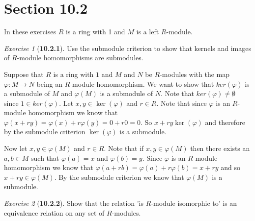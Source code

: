 \documentclass[12pt]{amsart}
\makeatletter
\theoremstyle{remark}
\newtheorem*{exercise}{Exercise}%
\renewenvironment{proof}[1][\proofname]{\par\doublespacing
  \pushQED{\qed}%
  \normalfont \topsep6\p@\@plus6\p@\relax
  \list{}{%
    \settowidth{\leftmargin}{\itshape\proofname:\hskip\labelsep}%
    \setlength{\labelwidth}{0pt}%
    \setlength{\itemindent}{-\leftmargin}%
  }%
  \item[\hskip\labelsep\itshape#1\@addpunct{:}]\ignorespaces
}{%
  \popQED\endlist\@endpefalse
  \singlespacing
}
\theoremstyle{mycomment}
\makeatother
\begin{document}
\section*{\textbf{Section 10.2}} In these exercises $R$ is a ring with 1 and $M$ is a left $R$-module. 
 \begin{exercise}[\textbf{10.2.1}] Use the submodule criterion to show that kernels and images of $R$-module homomorphisms are 
  submodules. 
    \begin{proof} Suppose that $R$ is a ring with $1$ and $M$ and $N$ be $R$-modules with the map $\varphi: M \to N$ being
      an $R$-module homomorphism. We want to show that $ker(\varphi)$ is a submodule of $M$ and $\varphi(M)$ is a submodule of $N$.
      Note that $ker(\varphi) \neq \emptyset$ since $1 \in ker(\varphi)$. Let $x, y \in \ker(\varphi)$ and $r \in R$. Note that since $\varphi$ is an $R$-module homomorphism we know that $\varphi(x + ry) = \varphi(x) + r\varphi(y) = 0 + r0 = 0$. So $x + ry \ker(\varphi)$ and therefore by the submodule criterion $\ker(\varphi)$ is a submodule. 

      Now let $x, y \in \varphi(M)$ and $r \in R$. Note that if $x, y \in \varphi(M)$ then there exists an $a, b \in M$ such that 
      $\varphi(a) = x$ and $\varphi(b) = y$. Since $\varphi$ is an $R$-module homomorphism we know that $\varphi(a + rb) = \varphi(a) + r\varphi(b) = x + ry$ and so $x + ry \in \varphi(M)$. By the submodule criterion we know that $\varphi(M)$ is a submodule.  
      \end{proof}
\end{exercise}
\vspace{.5in}

\begin{exercise}[\textbf{10.2.2}] Show that the relation 'is $R$-module isomorphic to' is an equivalence relation on any set of $R$-modules.
    \begin{proof}
    \end{proof}
\end{exercise}
\end{document}
